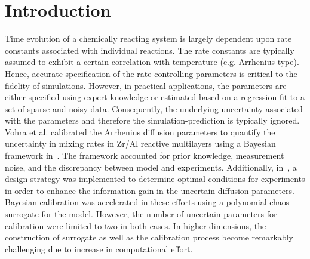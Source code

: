 \section{Introduction}
\label{sec:intro}



Time evolution of a chemically reacting system is largely dependent upon rate constants
associated with individual reactions. The rate constants are typically assumed to exhibit
a certain correlation with temperature (e.g. Arrhenius-type). Hence, accurate specification
of the rate-controlling parameters is critical to the fidelity of simulations. However,
in practical applications, the parameters are either specified using expert knowledge or
estimated based on a regression-fit to a set of sparse and noisy data. Consequently, the
underlying uncertainty associated with the parameters and therefore the simulation-prediction
is typically ignored. Vohra et al. calibrated the Arrhenius diffusion parameters to quantify
the uncertainty in mixing rates in Zr/Al reactive multilayers using a Bayesian framework
in~\cite{Vohra:2014}. The framework accounted for prior knowledge,
measurement noise, and the discrepancy between model and experiments. Additionally, 
in~\cite{Vohra:2017}, a design strategy was implemented to determine optimal conditions
for experiments in order to enhance the information gain in the uncertain diffusion parameters.
Bayesian calibration was accelerated in these efforts using a polynomial 
chaos~\cite{Ghanem:2003, Xiu:2002} surrogate for the model. However,
the number of uncertain parameters for calibration were limited to two in both cases. In
higher dimensions, the construction of surrogate as well as the calibration process become
remarkably challenging due to increase in computational effort. 

